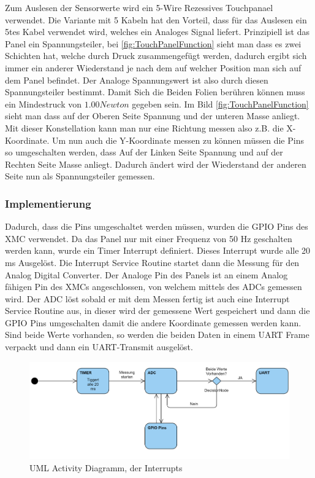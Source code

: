 \documentclass[12pt,a4paper,bibliography=totoc,listof=totoc]{scrartcl}
\begin{document}
Zum Auslesen der Sensorwerte wird ein 5-Wire Rezessives Touchpanael verwendet.
Die Variante mit 5 Kabeln hat den Vorteil, dass für das Auslesen ein 5tes Kabel verwendet wird, welches
ein Analoges Signal liefert. Prinzipiell ist das Panel ein Spannungsteiler, bei \ref{fig:TouchPanelFunction} 
sieht man dass es zwei Schichten hat, welche durch Druck zusammengefügt werden, dadurch ergibt sich 
immer ein anderer Wiederstand je nach dem auf welcher Position man sich auf dem Panel befindet. Der Analoge 
Spannungswert ist also durch diesen Spannungsteiler bestimmt. Damit Sich die Beiden Folien berühren können
muss ein Mindestruck von $1.00 Newton$ gegeben sein. Im Bild \ref{fig:TouchPanelFunction} sieht man dass auf der 
Oberen Seite Spannung und der unteren Masse anliegt. Mit dieser Konstellation kann man nur eine Richtung messen 
also z.B. die X-Koordinate. Um nun auch die Y-Koordinate messen zu können müssen die Pins so umgeschalten werden, 
dass Auf der Linken Seite Spannung und auf der Rechten Seite Masse anliegt. Dadurch ändert wird der Wiederstand der
anderen Seite nun als Spannungsteiler gemessen. 

\subsubsection{Implementierung}
Dadurch, dass die Pins umgeschaltet werden müssen, wurden die GPIO Pins des XMC verwendet. Da das Panel nur mit einer
Frequenz von 50 Hz geschalten werden kann, wurde ein Timer Interrupt definiert. Dieses Interrupt wurde alle 20 ms 
Ausgelöst. Die Interrupt Service Routine startet dann die Messung für den Analog Digital Converter. 
Der Analoge Pin des Panels ist an einem Analog fähigen Pin des XMCs angeschlossen, von welchem mittels des ADCs 
gemessen wird. Der ADC löst sobald er mit dem Messen fertig ist auch eine Interrupt Service Routine aus, in dieser 
wird der gemessene Wert gespeichert und dann die GPIO Pins umgeschalten damit die andere Koordinate gemessen werden kann.
Sind beide Werte vorhanden, so werden die beiden Daten in einem UART Frame verpackt und dann ein UART-Transmit ausgelöst.

\begin{figure}[htbp]
	\centering
	\includegraphics[scale = 0.6]{pics/TouchUML.png}
	\caption{UML Activity Diagramm, der Interrupts}
	\label{TouchUML}
\end{figure}
\end{document}
